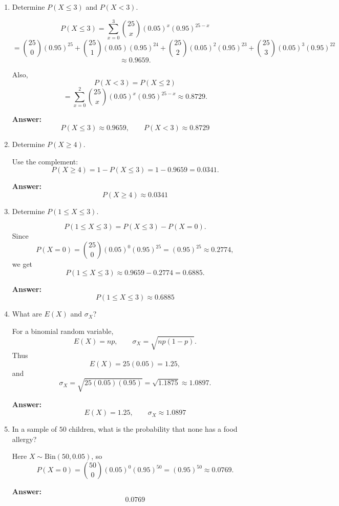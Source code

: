 \documentclass[11pt]{article}
\begin{document}
\begin{enumerate}
    \item[(a)] Determine \(P(X\le 3)\) and \(P(X<3)\).

    \[
    P(X\le 3)=\sum_{x=0}^{3}\binom{25}{x}(0.05)^x(0.95)^{25-x}
    \]
    \[
    =\binom{25}{0}(0.95)^{25}
    +\binom{25}{1}(0.05)(0.95)^{24}
    +\binom{25}{2}(0.05)^2(0.95)^{23}
    +\binom{25}{3}(0.05)^3(0.95)^{22}
    \]
    \[
    \approx 0.9659.
    \]

    Also,
    \[
    P(X<3)=P(X\le 2)
    \]
    \[
    =\sum_{x=0}^{2}\binom{25}{x}(0.05)^x(0.95)^{25-x}
    \approx 0.8729.
    \]

    \textbf{Answer:}
    \[
    \boxed{P(X\le 3)\approx 0.9659,\qquad P(X<3)\approx 0.8729}
    \]

    \item[(b)] Determine \(P(X\ge 4)\).

    Use the complement:
    \[
    P(X\ge 4)=1-P(X\le 3)=1-0.9659=0.0341.
    \]

    \textbf{Answer:}
    \[
    \boxed{P(X\ge 4)\approx 0.0341}
    \]

    \item[(c)] Determine \(P(1\le X\le 3)\).

    \[
    P(1\le X\le 3)=P(X\le 3)-P(X=0).
    \]
    Since
    \[
    P(X=0)=\binom{25}{0}(0.05)^0(0.95)^{25}=(0.95)^{25}\approx 0.2774,
    \]
    we get
    \[
    P(1\le X\le 3)\approx 0.9659-0.2774=0.6885.
    \]

    \textbf{Answer:}
    \[
    \boxed{P(1\le X\le 3)\approx 0.6885}
    \]

    \item[(d)] What are \(E(X)\) and \(\sigma_X\)?

    For a binomial random variable,
    \[
    E(X)=np, \qquad \sigma_X=\sqrt{np(1-p)}.
    \]
    Thus
    \[
    E(X)=25(0.05)=1.25,
    \]
    and
    \[
    \sigma_X=\sqrt{25(0.05)(0.95)}=\sqrt{1.1875}\approx 1.0897.
    \]

    \textbf{Answer:}
    \[
    \boxed{E(X)=1.25,\qquad \sigma_X\approx 1.0897}
    \]

    \item[(e)] In a sample of \(50\) children, what is the probability that none has a food allergy?

    Here \(X \sim \mathrm{Bin}(50,0.05)\), so
    \[
    P(X=0)=\binom{50}{0}(0.05)^0(0.95)^{50}=(0.95)^{50}\approx 0.0769.
    \]

    \textbf{Answer:}
    \[
    \boxed{0.0769}
    \]
\end{enumerate}
\end{document}
